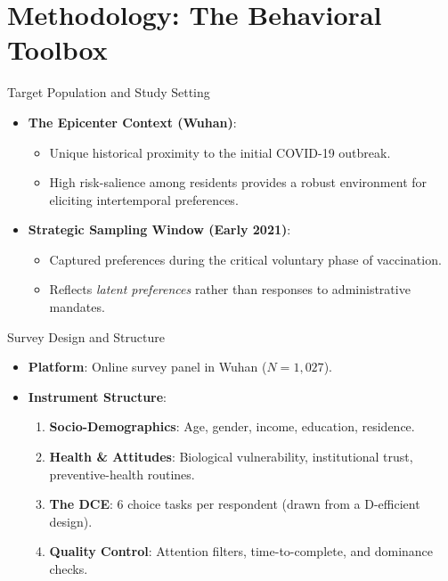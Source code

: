 \documentclass[10pt]{beamer}
\begin{document}
\section{Methodology: The Behavioral Toolbox}

\begin{frame}{Target Population and Study Setting}
\begin{itemize}
\item \textbf{The Epicenter Context (Wuhan)}:
\begin{itemize}
\item Unique historical proximity to the initial COVID-19 outbreak.
\item High \alert{risk-salience} among residents provides a robust environment for eliciting intertemporal preferences.
\end{itemize}
\item \textbf{Strategic Sampling Window (Early 2021)}:
\begin{itemize}
\item Captured preferences during the critical voluntary phase of vaccination.
\item Reflects \textit{latent preferences} rather than responses to administrative mandates.
\end{itemize}
\end{itemize}
\end{frame}

\begin{frame}{Survey Design and Structure}
\begin{itemize}
\item \textbf{Platform}: Online survey panel in Wuhan ($N=1,027$).
\item \textbf{Instrument Structure}:
\begin{enumerate}
\item \textbf{Socio-Demographics}: Age, gender, income, education, residence.
\item \textbf{Health \& Attitudes}: Biological vulnerability, institutional trust, preventive-health routines.
\item \textbf{The DCE}: 6 choice tasks per respondent (drawn from a D-efficient design).
\item \textbf{Quality Control}: Attention filters, time-to-complete, and dominance checks.
\end{enumerate}
\end{itemize}
\end{frame}
\end{document}

